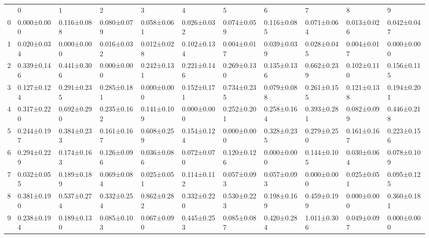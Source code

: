 \begin{tabular}{lllllllllll}
 & 0 & 1 & 2 & 3 & 4 & 5 & 6 & 7 & 8 & 9 \\
0 & 0.000±0.000 & 0.116±0.088 & 0.080±0.079 & 0.058±0.061 & 0.026±0.032 & 0.074±0.059 & 0.116±0.085 & 0.071±0.064 & 0.013±0.026 & 0.042±0.047 \\
1 & 0.020±0.034 & 0.000±0.000 & 0.016±0.032 & 0.012±0.028 & 0.102±0.134 & 0.004±0.017 & 0.039±0.039 & 0.028±0.045 & 0.004±0.017 & 0.000±0.000 \\
2 & 0.339±0.146 & 0.441±0.306 & 0.000±0.000 & 0.242±0.131 & 0.221±0.146 & 0.269±0.130 & 0.135±0.136 & 0.662±0.239 & 0.102±0.110 & 0.156±0.115 \\
3 & 0.127±0.124 & 0.291±0.235 & 0.285±0.181 & 0.000±0.000 & 0.152±0.171 & 0.734±0.235 & 0.079±0.088 & 0.261±0.155 & 0.121±0.138 & 0.194±0.201 \\
4 & 0.317±0.220 & 0.692±0.290 & 0.235±0.162 & 0.141±0.109 & 0.000±0.000 & 0.252±0.201 & 0.258±0.164 & 0.393±0.281 & 0.082±0.099 & 0.446±0.218 \\
5 & 0.244±0.197 & 0.384±0.233 & 0.161±0.167 & 0.608±0.259 & 0.154±0.124 & 0.000±0.000 & 0.328±0.235 & 0.279±0.250 & 0.161±0.167 & 0.223±0.156 \\
6 & 0.294±0.229 & 0.174±0.163 & 0.126±0.096 & 0.036±0.086 & 0.072±0.070 & 0.120±0.126 & 0.000±0.000 & 0.144±0.105 & 0.030±0.064 & 0.078±0.109 \\
7 & 0.032±0.055 & 0.189±0.189 & 0.069±0.084 & 0.025±0.051 & 0.114±0.112 & 0.057±0.093 & 0.057±0.093 & 0.000±0.000 & 0.025±0.051 & 0.095±0.125 \\
8 & 0.381±0.190 & 0.537±0.274 & 0.332±0.254 & 0.862±0.282 & 0.332±0.220 & 0.530±0.223 & 0.198±0.169 & 0.459±0.199 & 0.000±0.000 & 0.360±0.181 \\
9 & 0.238±0.194 & 0.189±0.130 & 0.085±0.103 & 0.067±0.090 & 0.445±0.253 & 0.085±0.087 & 0.420±0.284 & 1.011±0.306 & 0.049±0.097 & 0.000±0.000 \\
\end{tabular}

